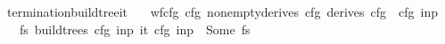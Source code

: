 \begin{isabellebody}
\ termination{\isacharunderscore}{\kern0pt}build{\isacharunderscore}{\kern0pt}tree{\isacharunderscore}{\kern0pt}{\isasymII}{\isacharunderscore}{\kern0pt}it{\isacharcolon}{\kern0pt}\isanewline
\ \ \ {\isachardoublequoteopen}wf{\isacharunderscore}{\kern0pt}cfg\ cfg{\isachardoublequoteclose}\ {\isachardoublequoteopen}nonempty{\isacharunderscore}{\kern0pt}derives\ cfg{\isachardoublequoteclose}\ {\isachardoublequoteopen}derives\ cfg\ {\isacharbrackleft}{\kern0pt}{\isasymSS}\ cfg{\isacharbrackright}{\kern0pt}\ inp{\isachardoublequoteclose}\isanewline
\ \ \ {\isachardoublequoteopen}{\isasymexists}fs{\isachardot}{\kern0pt}\ build{\isacharunderscore}{\kern0pt}trees\ cfg\ inp\ {\isacharparenleft}{\kern0pt}{\isasymII}{\isacharunderscore}{\kern0pt}it\ cfg\ inp{\isacharparenright}{\kern0pt}\ {\isacharequal}{\kern0pt}\ Some\ fs{\isachardoublequoteclose}%
\isadelimproof
%
\endisadelimproof
%
\isatagproof
%
\endisatagproof
{\isafoldproof}%
%
\isadelimproof
%
\endisadelimproof
%
\isadelimdocument
%
\endisadelimdocument
%
\isatagdocument
%
\isamarkuptrue%
%
\endisatagdocument
{\isafolddocument}%
%
\isadelimdocument
%
\endisadelimdocument
%
\isadelimtheory
%
\endisadelimtheory
%
\isatagtheory
%
\endisatagtheory
{\isafoldtheory}%
%
\isadelimtheory
%
\endisadelimtheory
%
\end{isabellebody}%
\endinput
